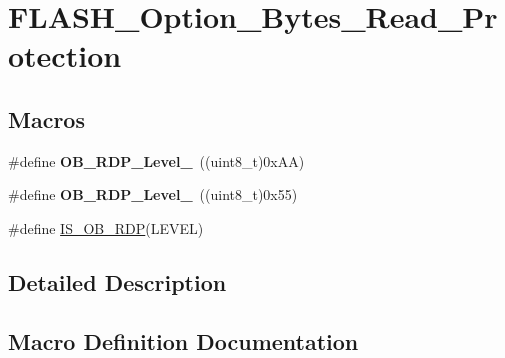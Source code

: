 \hypertarget{group___f_l_a_s_h___option___bytes___read___protection}{}\section{F\+L\+A\+S\+H\+\_\+\+Option\+\_\+\+Bytes\+\_\+\+Read\+\_\+\+Protection}
\label{group___f_l_a_s_h___option___bytes___read___protection}
\subsection*{Macros}
\begin{DoxyCompactItemize}
\item 
\hypertarget{group___f_l_a_s_h___option___bytes___read___protection_gae0417128469ebd025ef619bb9bd28271}{}\#define {\bfseries O\+B\+\_\+\+R\+D\+P\+\_\+\+Level\+\_}~((uint8\+\_\+t)0x\+A\+A)\label{group___f_l_a_s_h___option___bytes___read___protection_gae0417128469ebd025ef619bb9bd28271}

\item 
\hypertarget{group___f_l_a_s_h___option___bytes___read___protection_gaeee87887410dcc3d47f0e6416f1d49d5}{}\#define {\bfseries O\+B\+\_\+\+R\+D\+P\+\_\+\+Level\+\_}~((uint8\+\_\+t)0x55)\label{group___f_l_a_s_h___option___bytes___read___protection_gaeee87887410dcc3d47f0e6416f1d49d5}

\item 
\#define \hyperlink{group___f_l_a_s_h___option___bytes___read___protection_ga9f6200da3a5294668e1b24b65f85b34a}{I\+S\+\_\+\+O\+B\+\_\+\+R\+D\+P}(L\+E\+V\+E\+L)
\end{DoxyCompactItemize}


\subsection{Detailed Description}


\subsection{Macro Definition Documentation}
\hypertarget{group___f_l_a_s_h___option___bytes___read___protection_ga9f6200da3a5294668e1b24b65f85b34a}{}
